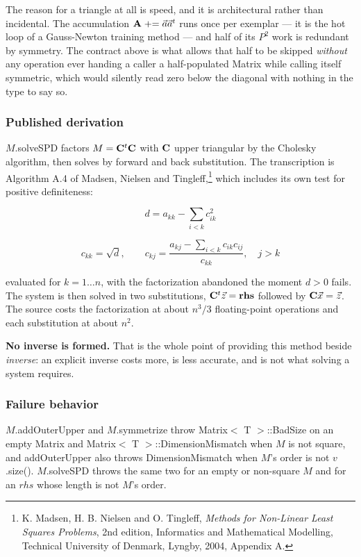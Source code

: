 \documentclass{report}
\begin{document}
The reason for a triangle at all is speed, and it is architectural rather than
incidental.  The accumulation ${\bf A} \mathrel{+}= \vec{a}\vec{a}^t$ runs once
per exemplar --- it is the hot loop of a Gauss-Newton training method --- and
half of its $P^2$ work is redundant by symmetry.  The contract above is what
allows that half to be skipped {\em without} any operation ever handing a caller
a half-populated Matrix while calling itself symmetric, which would silently read
zero below the diagonal with nothing in the type to say so.

\subsubsection{Published derivation}

$M$.solveSPD factors $M = {\bf C}^t{\bf C}$ with ${\bf C}$ upper triangular by
the Cholesky algorithm, then solves by forward and back substitution.  The
transcription is Algorithm A.4 of Madsen, Nielsen and
Tingleff,\footnote{K. Madsen, H. B. Nielsen and O. Tingleff, {\em Methods for
Non-Linear Least Squares Problems}, 2nd edition, Informatics and Mathematical
Modelling, Technical University of Denmark, Lyngby, 2004, Appendix
A.} which includes its own
test for positive definiteness:

\[
d = a_{kk} - \sum_{i<k} c_{ik}^2
\]

\[
c_{kk} = \sqrt{d}, \qquad
c_{kj} = \frac{a_{kj} - \sum_{i<k} c_{ik}c_{ij}}{c_{kk}}, \quad j > k
\]

evaluated for $k = 1 \ldots n$, with the factorization abandoned the moment
$d > 0$ fails.  The system is then solved in two substitutions,
${\bf C}^t\vec{z} = {\bf rhs}$ followed by ${\bf C}\vec{x} = \vec{z}$.  The
source costs the factorization at about $n^3/3$ floating-point operations and
each substitution at about $n^2$.

{\bf No inverse is formed.}  That is the whole point of providing this method
beside {\em inverse}: an explicit inverse costs more, is less accurate, and is
not what solving a system requires.

\subsubsection{Failure behavior}

$M$.addOuterUpper and $M$.symmetrize throw Matrix$<$ T $>$::BadSize on an empty
Matrix and Matrix$<$ T $>$::DimensionMismatch when $M$ is not square, and
addOuterUpper also throws DimensionMismatch when $M$'s order is not $v$.size().
$M$.solveSPD throws the same two for an empty or non-square $M$ and for an
$rhs$ whose length is not $M$'s order.
\end{document}
